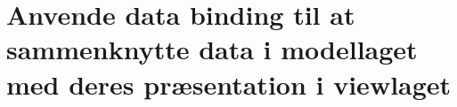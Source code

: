 \section{Anvende data binding til at sammenknytte data i modellaget med deres præsentation i viewlaget}\label{sec:spm7}

